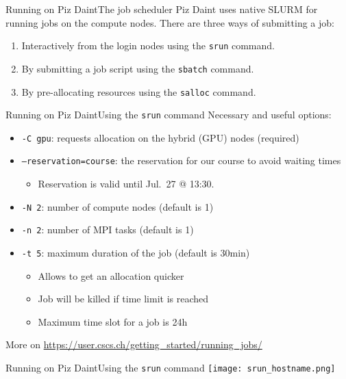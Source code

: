 \begin{frame}{Running on Piz Daint}{The job scheduler}
  Piz Daint uses native SLURM for running jobs on the compute nodes.
  There are three ways of submitting a job:
  \vspace\baselineskip
  \begin{enumerate}
  \item Interactively from the login nodes using the \texttt{srun} command.
  \item By submitting a job script using the \texttt{sbatch} command.
  \item By pre-allocating resources using the \texttt{salloc} command.
  \end{enumerate}
\end{frame}

\begin{frame}[fragile]{Running on Piz Daint}{Using the \texttt{srun} command}
  Necessary and useful options:
  \begin{itemize}
  \item \texttt{-C gpu}: requests allocation on the hybrid (GPU) nodes (required)
  \item \texttt{--reservation=course}: the reservation for our course to avoid waiting times
    \begin{itemize}
    \item Reservation is valid until Jul.\ 27 @ 13:30.
    \end{itemize}
  \item \texttt{-N 2}: number of compute nodes (default is 1)
  \item \texttt{-n 2}: number of MPI tasks (default is 1)
  \item \texttt{-t 5}: maximum duration of the job (default is 30min)
    \begin{itemize}
    \item Allows to get an allocation quicker
    \item Job will be killed if time limit is reached
    \item Maximum time slot for a job is 24h
    \end{itemize}
  \end{itemize}
  More on \url{https://user.cscs.ch/getting_started/running_jobs/}
\end{frame}

\begin{frame}[fragile]{Running on Piz Daint}{Using the \texttt{srun} command}
  {
    \centering
    \texttt{[image: srun\_hostname.png]}
  }
\end{frame}

